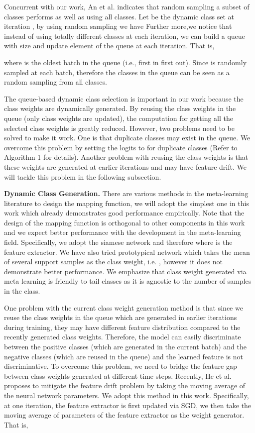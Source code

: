 \documentclass[10pt,twocolumn,letterpaper]{article}
\begin{document}
 Concurrent with our work, An et al.\cite{an2020partial} indicates that random sampling a subset of classes performs as well as using all classes. Let  be the dynamic class set at iteration , by using random sampling we have  Further more,we notice that instead of using totally different classes at each iteration, we can build a queue with size  and update  element of the queue at each iteration. That is,

where  is the oldest batch in the queue (i.e., first in first out). Since  is randomly sampled at each batch, therefore the classes in the queue can be seen as a random sampling from all classes. 

The queue-based dynamic class selection is important in our work because the class weights are dynamically generated. By reusing the  class weights in the queue (only  class weights are updated), the computation for getting all the selected class weights is greatly reduced. However, two problems need to be solved to make it work. One is that duplicate classes may exist in the queue. We overcome this problem by setting the logits to  for duplicate classes (Refer to Algorithm 1 for details). Another problem with reusing the class weights is that these weights are generated at earlier iterations and may have feature drift. We will tackle this problem in the following subsection.

\textbf{Dynamic Class Generation.} There are various methods in the meta-learning literature to design the mapping function, we will adopt the simplest one in this work which already demonstrates good performance empirically. Note that the design of the mapping function is orthogonal to other components in this work and we expect better performance with the development in the meta-learning field. Specifically, we adopt the siamese network and therefore  where  is the feature extractor. We have also tried prototypical network which takes the mean of several support samples as the class weight, i.e. , however it does not demonstrate better performance. We emphasize that class weight generated via meta learning is friendly to tail classes as it is agnostic to the number of samples in the class.

One problem with the current class weight generation method is that since we reuse the  class weights in the queue which are generated in earlier iterations during training, they may have different feature distribution compared to the recently generated class weights. Therefore, the model can easily discriminate between the positive classes (which are generated in the current batch) and the negative classes (which are reused in the queue) and the learned feature is not discriminative. To overcome this problem, we need to bridge the feature gap between class weights generated at different time steps. Recently, He et al.\cite{he_momentum_2020} proposes to mitigate the feature drift problem by taking the moving average of the neural network parameters. We adopt this method in this work. Specifically, at one iteration, the feature extractor is first updated via SGD, we then take the moving average of parameters of the feature extractor as the weight generator. That is,
\end{document}
